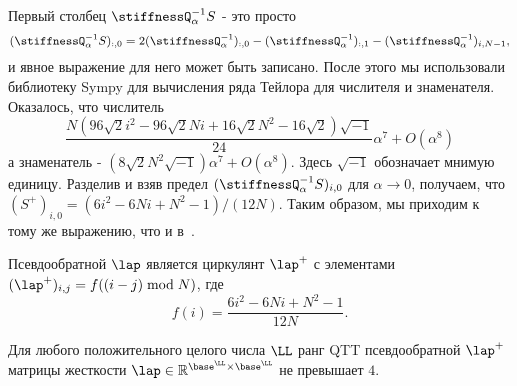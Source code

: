 Первый столбец $\stiffnessQ_\alpha^{-1}S$ - это просто
\[
(\stiffnessQ_\alpha^{-1}S)_{:,0} = 2(\stiffnessQ_\alpha^{-1})_{:,0} - (\stiffnessQ_\alpha^{-1})_{:,1} - (\stiffnessQ_\alpha^{-1})_{i,N-1},
\]
и явное выражение для него может быть записано.
После этого мы использовали библиотеку Sympy для вычисления ряда Тейлора для числителя и знаменателя.
Оказалось, что числитель
\[
\frac{N \left(96 \sqrt{2} i^{2} - 96 \sqrt{2} N i + 16 \sqrt{2} N^{2}  - 16 \sqrt{2}\right)\sqrt{-1}}{24}\alpha^7 + O(\alpha^8)
\]
а знаменатель - $(8\sqrt{2}N^2\sqrt{-1})\alpha^7 + O(\alpha^8)$.
Здесь $\sqrt{-1}$ обозначает мнимую единицу.
Разделив и взяв предел $(\stiffnessQ_\alpha^{-1}S)_{i,0}$ для $\alpha \to 0$, получаем, что
$(S^+)_{i,0} = (6i^2 - 6Ni + N^2-1)/(12N)$.
Таким образом, мы приходим к тому же выражению, что и в~\cite{plonka2016pseudo}.
\begin{proposition}
	Псевдообратной $\lap$ является циркулянт $\lap^+$ с элементами $(\lap^+)_{i,j} = f((i-j)\bmod N)$, где
	\[
	f(i) = \frac{6i^2 - 6Ni + N^2-1}{12N}.
	\]
\end{proposition}
\begin{corollary}
	Для любого положительного целого числа $\LL$ ранг QTT псевдообратной $\lap^+$ матрицы жесткости $\lap \in \mathbb{R}^{\base^\LL \times \base^\LL}$ не превышает $4$.
\end{corollary}









